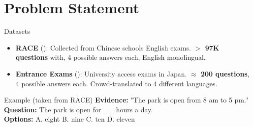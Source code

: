 \documentclass[]{beamer}
\begin{document}
\section{Problem Statement}
  \begin{frame}{\secname}
    \begin{alertblock}{Datasets}
      \begin{itemize}
        \item \textbf{RACE} (\cite{Lai2017}): Collected from Chinese schools English exams. \textbf{$>$ 97K questions} with, 4 possible answers each, English monolingual.
        \item \textbf{Entrance Exams} (\cite{rodrigo_systems_2018}): University access exams in Japan. \textbf{$\approx$ 200 questions}, 4 possible answers each. Crowd-translated to 4 different languages.
      \end{itemize}
    \end{alertblock}
    \begin{alertblock}{Example (taken from RACE)}
      \textbf{Evidence:} "The park is open from 8 am to 5 pm." \\
      \textbf{Question:} The park is open for \_\_ hours a day. \\
      \textbf{Options:} A. eight B. nine C. ten D. eleven
    \end{alertblock}
  \end{frame}

\end{document}
